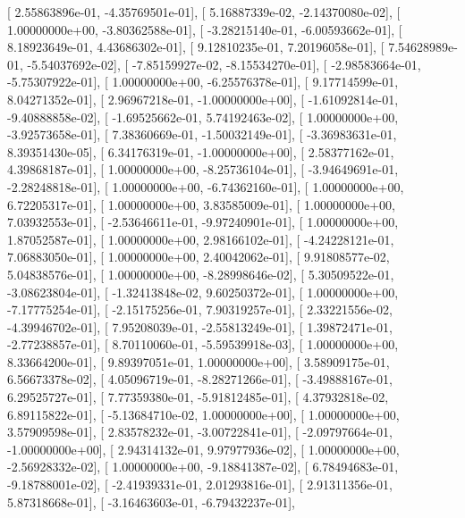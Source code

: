 \documentclass{article}
\begin{document}
       [  2.55863896e-01,  -4.35769501e-01],
       [  5.16887339e-02,  -2.14370080e-02],
       [  1.00000000e+00,  -3.80362588e-01],
       [ -3.28215140e-01,  -6.00593662e-01],
       [  8.18923649e-01,   4.43686302e-01],
       [  9.12810235e-01,   7.20196058e-01],
       [  7.54628989e-01,  -5.54037692e-02],
       [ -7.85159927e-02,  -8.15534270e-01],
       [ -2.98583664e-01,  -5.75307922e-01],
       [  1.00000000e+00,  -6.25576378e-01],
       [  9.17714599e-01,   8.04271352e-01],
       [  2.96967218e-01,  -1.00000000e+00],
       [ -1.61092814e-01,  -9.40888858e-02],
       [ -1.69525662e-01,   5.74192463e-02],
       [  1.00000000e+00,  -3.92573658e-01],
       [  7.38360669e-01,  -1.50032149e-01],
       [ -3.36983631e-01,   8.39351430e-05],
       [  6.34176319e-01,  -1.00000000e+00],
       [  2.58377162e-01,   4.39868187e-01],
       [  1.00000000e+00,  -8.25736104e-01],
       [ -3.94649691e-01,  -2.28248818e-01],
       [  1.00000000e+00,  -6.74362160e-01],
       [  1.00000000e+00,   6.72205317e-01],
       [  1.00000000e+00,   3.83585009e-01],
       [  1.00000000e+00,   7.03932553e-01],
       [ -2.53646611e-01,  -9.97240901e-01],
       [  1.00000000e+00,   1.87052587e-01],
       [  1.00000000e+00,   2.98166102e-01],
       [ -4.24228121e-01,   7.06883050e-01],
       [  1.00000000e+00,   2.40042062e-01],
       [  9.91808577e-02,   5.04838576e-01],
       [  1.00000000e+00,  -8.28998646e-02],
       [  5.30509522e-01,  -3.08623804e-01],
       [ -1.32413848e-02,   9.60250372e-01],
       [  1.00000000e+00,  -7.17775254e-01],
       [ -2.15175256e-01,   7.90319257e-01],
       [  2.33221556e-02,  -4.39946702e-01],
       [  7.95208039e-01,  -2.55813249e-01],
       [  1.39872471e-01,  -2.77238857e-01],
       [  8.70110060e-01,  -5.59539918e-03],
       [  1.00000000e+00,   8.33664200e-01],
       [  9.89397051e-01,   1.00000000e+00],
       [  3.58909175e-01,   6.56673378e-02],
       [  4.05096719e-01,  -8.28271266e-01],
       [ -3.49888167e-01,   6.29525727e-01],
       [  7.77359380e-01,  -5.91812485e-01],
       [  4.37932818e-02,   6.89115822e-01],
       [ -5.13684710e-02,   1.00000000e+00],
       [  1.00000000e+00,   3.57909598e-01],
       [  2.83578232e-01,  -3.00722841e-01],
       [ -2.09797664e-01,  -1.00000000e+00],
       [  2.94314132e-01,   9.97977936e-02],
       [  1.00000000e+00,  -2.56928332e-02],
       [  1.00000000e+00,  -9.18841387e-02],
       [  6.78494683e-01,  -9.18788001e-02],
       [ -2.41939331e-01,   2.01293816e-01],
       [  2.91311356e-01,   5.87318668e-01],
       [ -3.16463603e-01,  -6.79432237e-01],
\end{document}
